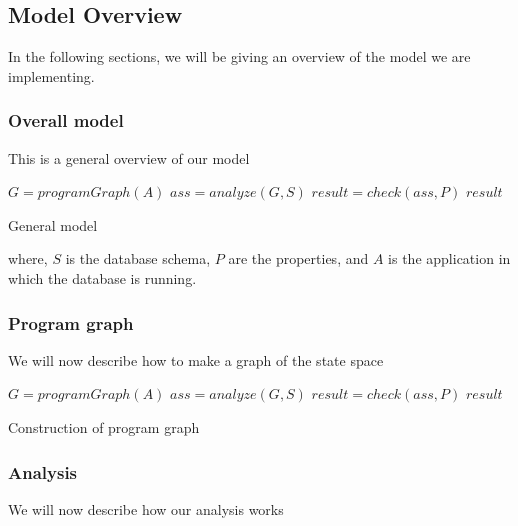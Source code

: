 \usepackage{algpseudocode}\subsection{Model Overview}\label{subsec:model-overview}

In the following sections, we will be giving an overview of the model we are implementing.

\subsubsection{Overall model}\label{subsubsec:overall-model}

This is a general overview of our model

\begin{algorithm}[htb!]
    \begin{codebox}
        \li $G = programGraph(A)$
        \li $ass = analyze(G,S)$
        \li $result = check(ass,P)$
        \li \Return $result$
    \end{codebox}
    \caption{General model}
    \label{alg:model}
\end{algorithm}
\noindent where, $S$ is the database schema, $P$ are the properties, and $A$ is the application in which the database is running.

\subsubsection{Program graph}\label{subsubsec:program-graph}

We will now describe how to make a graph of the state space

\begin{algorithm}[htb!]
    \begin{codebox}
        \li $G = programGraph(A)$
        \li $ass = analyze(G,S)$
        \li $result = check(ass,P)$
        \li \Return $result$
    \end{codebox}
    \caption{Construction of program graph}
    \label{alg:program-graph}
\end{algorithm}

\subsubsection{Analysis}\label{subsubsec:analysis}

We will now describe how our analysis works


